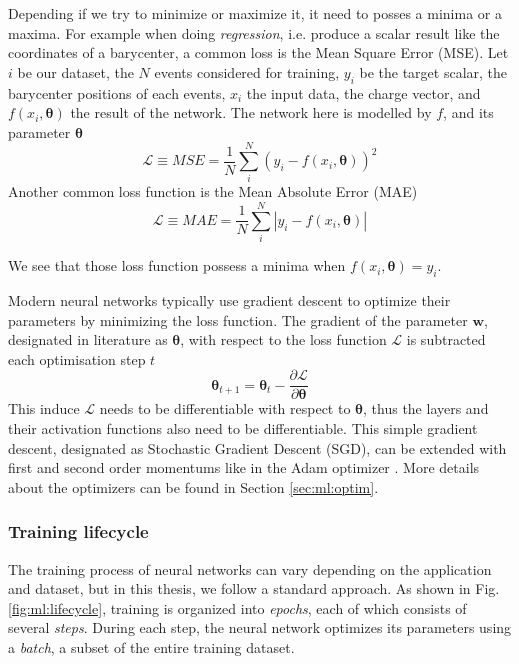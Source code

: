 \documentclass[../main.tex]{subfiles}
\begin{document}
Depending if we try to minimize or maximize it, it need to posses a minima or a maxima. For example when doing \textit{regression}, i.e. produce a scalar result like the coordinates of a barycenter, a common loss is the Mean Square Error (MSE). Let $i$ be our dataset, the $N$ events considered for training, $y_i$ be the target scalar, the barycenter positions of each events, $x_i$ the input data, the charge vector, and $f(x_i, \bm{\theta})$ the result of the network. The network here is modelled by $f$, and its parameter $\bm{\theta}$
\begin{equation}
  \mathcal{L} \equiv MSE = \frac{1}{N} \sum_i^N (y_i - f(x_i, \bm{\theta}))^2
\end{equation}
Another common loss function is the Mean Absolute Error (MAE)
\begin{equation}
  \mathcal{L} \equiv MAE = \frac{1}{N} \sum_i^N |y_i - f(x_i, \bm{\theta})|
\end{equation}

We see that those loss function possess a minima when $f(x_i, \bm{\theta}) = y_i$.


Modern neural networks typically use gradient descent to optimize their parameters by minimizing the loss function. The gradient of the parameter $\bm{w}$, designated in literature as $\bm{\theta}$, with respect to the loss function $\mathcal{L}$ is subtracted each optimisation step $t$
\begin{equation}
  \bm{\theta}_{t+1} = \bm{\theta}_t - \frac{\partial \mathcal{L}}{\partial \bm{\theta}}
\end{equation}
This induce $\mathcal{L}$  needs to be differentiable with respect to $\bm{\theta}$, thus the layers and their activation functions also need to be differentiable. This simple gradient descent, designated as Stochastic Gradient Descent (SGD), can be extended with first and second order momentums like in the Adam optimizer \cite{kingma_adam_2017}. More details about the optimizers can be found in Section \ref{sec:ml:optim}.

\subsubsection{Training lifecycle}

The training process of neural networks can vary depending on the application and dataset, but in this thesis, we follow a standard approach. As shown in Fig. \ref{fig:ml:lifecycle}, training is organized into \textit{epochs}, each of which consists of several \textit{steps}. During each step, the neural network optimizes its parameters using a \textit{batch}, a subset of the entire training dataset.
\end{document}
